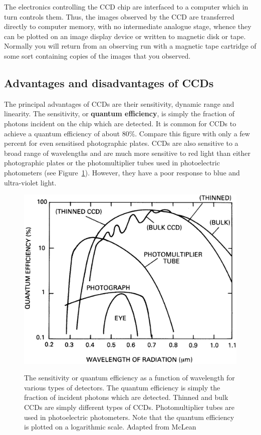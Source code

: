 \documentclass[twoside,11pt]{article}
\begin{document}
The electronics controlling the CCD chip are interfaced to a computer
which in turn controls them.  Thus, the images observed by the CCD are
transferred directly to computer memory, with no intermediate analogue
stage, whence they can be plotted on an image display device or written
to magnetic disk or tape.  Normally you will return from an observing
run with a magnetic tape cartridge of some sort containing copies of the
images that you observed.

\subsection{\label{ADDIS}Advantages and disadvantages of CCDs}

The principal advantages of CCDs are their sensitivity, dynamic range
and linearity.  The sensitivity, or {\bf quantum efficiency}, is simply
the fraction of photons incident on the chip which are detected.
It is common for CCDs to achieve a quantum efficiency of about 80\%.
Compare this figure with only a few percent for even sensitised
photographic plates.  CCDs are also sensitive to a broad range of
wavelengths and are much more sensitive to red light than either
photographic plates or the photomultiplier tubes used in photoelectric
photometers (see Figure~\ref{SENSITIVITY}).  However, they have a poor
response to blue and ultra-violet light.

\begin{figure}[htbp]
   \centering 
   \includegraphics[totalheight=3in]{sc5_sensitivity.ps}
   \begin{quote}
   \caption[The wavelength sensitivity of various types of detectors]{The
    sensitivity or quantum efficiency as a function of wavelength for various
    types of detectors.  The quantum efficiency is simply the fraction of
    incident photons which are detected.  Thinned and bulk CCDs are simply
    different types of CCDs.  Photomultiplier tubes are used in
    photoelectric photometers.  Note that the quantum efficiency is plotted
    on a logarithmic scale.  Adapted from McLean\cite{MCLEAN89, MCLEAN97}
   \label{SENSITIVITY} }
   \end{quote}
\end{figure}
\end{document}
